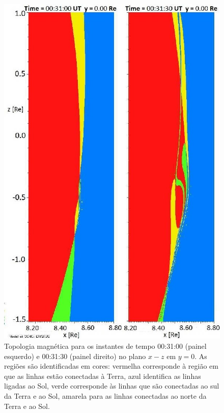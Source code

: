 \begin{figure}
	\begin{center}
		\includegraphics[scale=0.37]{topologia.jpg}
		\caption{Topologia magnética para os instantes de tempo 00:31:00 (painel esquerdo) e 00:31:30 (painel direito) no plano $x-z$ em $y= 0$. As regiões são identificadas em cores: vermelha corresponde à região em que as linhas estão conectadas à Terra, azul identifica as linhas ligadas ao Sol, verde corresponde às linhas que são conectadas ao sul da Terra e ao Sol, amarela para as linhas conectadas ao norte da Terra e ao Sol.}
		\label{topologia}
	\end{center}
\end{figure}

